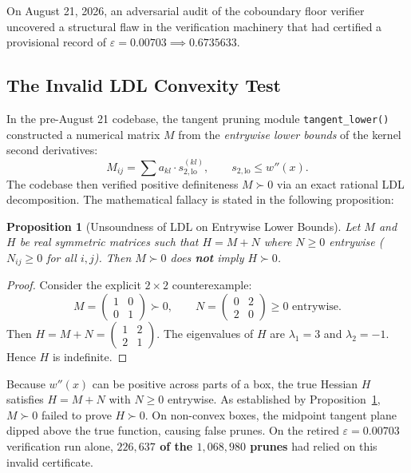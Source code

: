 \documentclass[11pt,a4paper]{article}
\newtheorem{proposition}[theorem]{Proposition}
\theoremstyle{remark}
\newcommand{\eps}{\varepsilon}
\begin{document}
On August 21, 2026, an adversarial audit of the coboundary floor verifier uncovered a structural flaw in the verification machinery that had certified a provisional record of $\eps = 0.00703 \implies 0.6735633$.

\subsection{The Invalid LDL Convexity Test}
In the pre-August 21 codebase, the tangent pruning module \texttt{tangent\_lower()} constructed a numerical matrix $M$ from the \emph{entrywise lower bounds} of the kernel second derivatives:
\[
 M_{ij} = \sum a_{kl} \cdot s_{2,\text{lo}}^{(kl)}, \qquad s_{2,\text{lo}} \le w''(x).
\]
The codebase then verified positive definiteness $M \succ 0$ via an exact rational LDL decomposition. The mathematical fallacy is stated in the following proposition:
\begin{proposition}[Unsoundness of LDL on Entrywise Lower Bounds]
\label{prop:unsound}
Let $M$ and $H$ be real symmetric matrices such that $H = M + N$ where $N \ge 0$ entrywise ($N_{ij} \ge 0$ for all $i,j$). Then $M \succ 0$ does \textbf{not} imply $H \succ 0$.
\end{proposition}
\begin{proof}
Consider the explicit $2 \times 2$ counterexample:
\[
 M = \begin{pmatrix} 1 & 0 \\ 0 & 1 \end{pmatrix} \succ 0, \qquad N = \begin{pmatrix} 0 & 2 \\ 2 & 0 \end{pmatrix} \ge 0 \text{ entrywise}.
\]
Then $H = M + N = \begin{pmatrix} 1 & 2 \\ 2 & 1 \end{pmatrix}$. The eigenvalues of $H$ are $\lambda_1 = 3$ and $\lambda_2 = -1$. Hence $H$ is indefinite.
\end{proof}
Because $w''(x)$ can be positive across parts of a box, the true Hessian $H$ satisfies $H = M + N$ with $N \ge 0$ entrywise. As established by Proposition~\ref{prop:unsound}, $M \succ 0$ failed to prove $H \succ 0$. On non-convex boxes, the midpoint tangent plane dipped above the true function, causing false prunes. On the retired $\eps = 0.00703$ verification run alone, \textbf{$226{,}637$ of the $1{,}068{,}980$ prunes} had relied on this invalid certificate.
\end{document}
